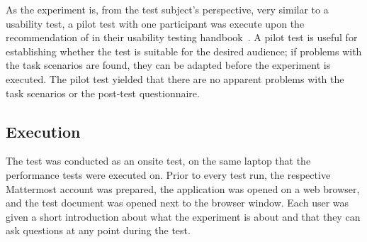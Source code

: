 As the experiment is, from the test subject's perspective, very similar to a usability test, a pilot test with one participant was execute upon the recommendation of \citeauthor{rubin2008handbook} in their usability testing handbook~\cite{rubin2008handbook}.
A pilot test is useful for establishing whether the test is suitable for the desired audience; if problems with the task scenarios are found, they can be adapted before the experiment is executed.
The pilot test yielded that there are no apparent problems with the task scenarios or the post-test questionnaire.

%
%
%
%
%
%


\subsection{Execution}

The test was conducted as an onsite test, on the same laptop that the performance tests were executed on.
Prior to every test run, the respective Mattermost account was prepared, the application was opened on a web browser, and the test document was opened next to the browser window.
Each user was given a short introduction about what the experiment is about and that they can ask questions at any point during the test.

